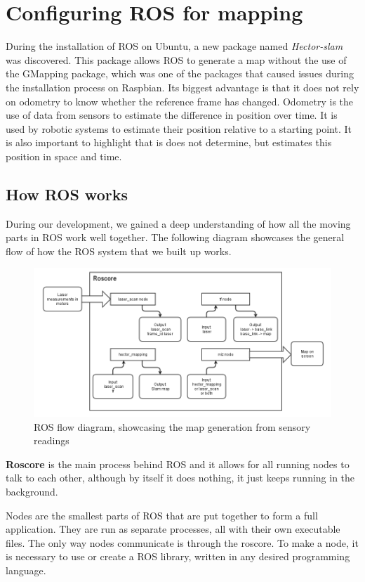 \clearpage
\section{Configuring ROS for mapping}

During the installation of ROS on Ubuntu, a new package named \textit{Hector-slam} was discovered. This package allows ROS to generate a map without the use of the GMapping package, which was one of the packages that caused issues during the installation process on Raspbian. Its biggest advantage is that it does not rely on odometry to know whether the reference frame has changed. Odometry is the use of data from sensors to estimate the difference in position over time. It is used by robotic systems to estimate their position relative to a starting point. It is also important to highlight that is does not determine, but estimates this position in space and time.

\subsection{How ROS works}
During our development, we gained a deep understanding of how all the moving parts in ROS work well together. The following diagram showcases the general flow of how the ROS system that we built up works.

\begin{figure}[H]
	\centering
	\includegraphics[width=1\linewidth]{images/ROSflow.png}
	\caption{ROS flow diagram, showcasing the map generation from sensory readings}
\end{figure}

\textbf{Roscore} is the main process behind ROS and it allows for all running nodes to talk to each other, although by itself it does nothing, it just keeps running in the background.

Nodes are the smallest parts of ROS that are put together to form a full application. They are run as separate processes, all with their own executable files. The only way nodes communicate is through the roscore. To make a node, it is necessary to use or create a ROS library, written in any desired programming language.

